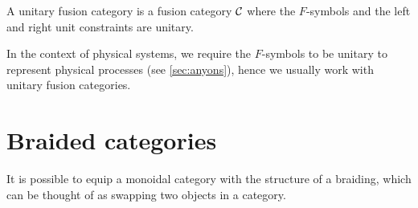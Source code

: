 \begin{defn}
	A unitary fusion category is a fusion category ${\mathcal{C}}$ where the $F$-symbols and the left and right unit constraints are unitary.
\end{defn}

In the context of physical systems, we require the $F$-symbols to be unitary to represent physical processes (see \cref{sec:anyons}), hence we usually work with unitary fusion categories.

\section{Braided categories}


	It is possible to equip a monoidal category with the structure of a braiding, which can be thought of as swapping two objects in a category.
	
